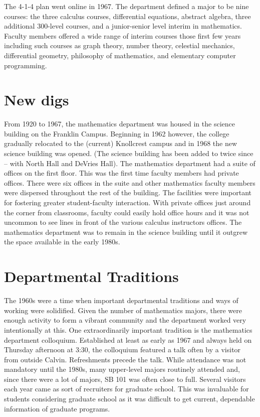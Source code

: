 \documentclass[
]{book}
\begin{document}
The 4-1-4 plan went online in 1967. The department defined a major to be nine courses: the three calculus courses, differential equations, abstract algebra, three additional 300-level courses, and a junior-senior level interim in mathematics. Faculty members offered a wide range of interim courses those first few years including such courses as graph theory, number theory, celestial mechanics, differential geometry, philosophy of mathematics, and elementary computer programming.

\hypertarget{new-digs}{%
\section{New digs}\label{new-digs}}

From 1920 to 1967, the mathematics department was housed in the science building on the Franklin Campus. Beginning in 1962 however, the college gradually relocated to the (current) Knollcrest campus and in 1968 the new science building was opened. (The science building has been added to twice since -- with North Hall and DeVries Hall). The mathematics department had a suite of offices on the first floor. This was the first time faculty members had private offices. There were six offices in the suite and other mathematics faculty members were dispersed throughout the rest of the building. The facilities were important for fostering greater student-faculty interaction. With private offices just around the corner from classrooms, faculty could easily hold office hours and it was not uncommon to see lines in front of the various calculus instructors offices. The mathematics department was to remain in the science building until it outgrew the space available in the early 1980s.

\hypertarget{departmental-traditions}{%
\section{Departmental Traditions}\label{departmental-traditions}}

The 1960s were a time when important departmental traditions and ways of working were solidified. Given the number of mathematics majors, there were enough activity to form a vibrant community and the department worked very intentionally at this. One extraordinarily important tradition is the mathematics department colloquium. Established at least as early as 1967 and always held on Thursday afternoon at 3:30, the colloquium featured a talk often by a visitor from outside Calvin. Refreshments precede the talk. While attendance was not mandatory until the 1980s, many upper-level majors routinely attended and, since there were a lot of majors, SB 101 was often close to full. Several visitors each year came as sort of recruiters for graduate school. This was invaluable for students considering graduate school as it was difficult to get current, dependable information of graduate programs.
\end{document}
